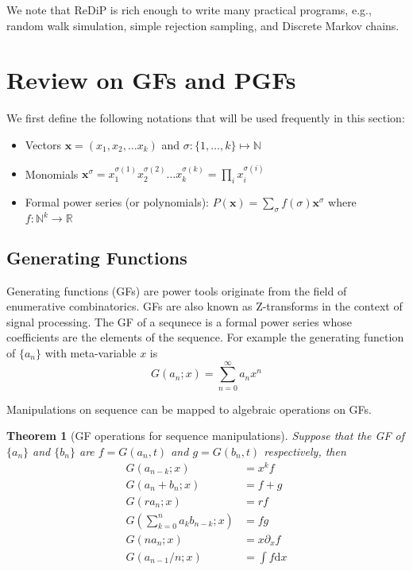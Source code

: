 \documentclass[a4paper]{article}
\newtheorem{theorem}{Theorem}[section]
\begin{document}
We note that ReDiP is rich enough to write many practical programs, e.g., random walk simulation, simple rejection sampling, and Discrete Markov chains.

\section{Review on GFs and PGFs}

We first define the following notations that will be used frequently in this section:

\begin{itemize}
	\item Vectors \(\mathbf{x} = (x_1,x_2,\ldots x_k)\) and \(\sigma: \{1,\ldots,k\}\mapsto \mathbb{N}\)
	\item Monomials \(\mathbf{x}^\sigma = x_1^{\sigma(1)} x_2^{\sigma(2)} \ldots x_k^{\sigma(k)} = \prod_i x_i^{\sigma(i)}\)
	\item Formal power series (or polynomials): \(P(\mathbf{x}) = \sum_{\sigma} f(\sigma) \mathbf{x}^\sigma\) where \(f: \mathbb{N}^k\to \mathbb{R}\)
\end{itemize}

\subsection{Generating Functions}

Generating functions\cite{gfbook} (GFs) are power tools originate from the field of enumerative combinatorics.
GFs are also known as Z-transforms in the context of signal processing.
The GF of a sequnece is a formal power series whose coefficients are the elements of the sequence. For example the generating function of \(\{a_n\}\) with meta-variable \(x\) is
\[
	G(a_n; x) = \sum_{n=0}^\infty a_n x^n
\]

Manipulations on sequence can be mapped to algebraic operations on GFs.
\begin{theorem}[GF operations for sequence manipulations]
	Suppose that the GF of \(\{a_n\}\) and \(\{b_n\}\) are \(f=G(a_n,t)\) and \(g=G(b_n,t)\) respectively, then
	\begin{align*}
		G\left(a_{n-k}; x\right)                     & = x^k f              \\
		G\left(a_{n} + b_{n}; x\right)               & = f+g                \\
		G\left(r a_{n}; x\right)                     & = r f                \\
		G\left(\sum_{k=0}^{n} a_{k}b_{n-k}; x\right) & = fg                 \\
		G\left(n a_n; x\right)                       & = x \partial_x f     \\
		G\left(a_{n-1}/n; x\right)                   & = \int f \mathrm{d}x \\
	\end{align*}
\end{theorem}
\end{document}
